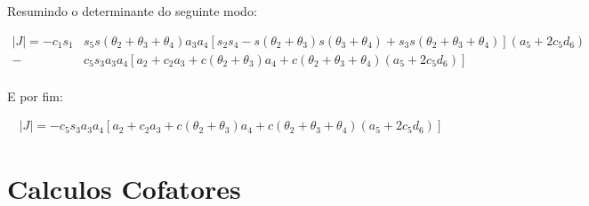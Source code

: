 Resumindo o determinante do seguinte modo:

\begin{align*}
    |J| = -c_1s_1&s_5s(\theta_2+\theta_3+\theta_4)a_3a_4[s_2s_4-s(\theta_2+\theta_3)s(\theta_3+\theta_4)+s_3s(\theta_2+\theta_3+\theta_4)](a_5+2c_5d_6) \\
                -&c_5s_3a_3a_4[a_2+c_2a_3+c(\theta_2+\theta_3)a_4+c(\theta_2+\theta_3+\theta_4)(a_5+2c_5d_6)] \\       
\end{align*}

E por fim:

\begin{align*}
    |J| = -c_5s_3a_3a_4[a_2+c_2a_3+c(\theta_2+\theta_3)a_4+c(\theta_2+\theta_3+\theta_4)(a_5+2c_5d_6)]    
\end{align*}

\section{Calculos Cofatores}
\label{AnexoJacobiana-SecCalcCofatores}

